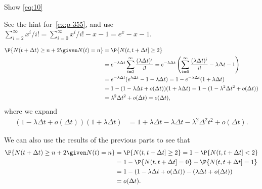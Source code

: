 \begin{exercise} \label{ex:p-35}
 Show \cref{eq:10}
\begin{hint}
See the hint for~\cref{ex:p-355}, and  use $\sum_{i=2}^\infty x^i/i! = \sum_{i=0}^\infty x^i/i! - x -1 = e^x -x - 1$.
\end{hint}
\begin{solution}
 \begin{align*}
 \P{N(t+\Delta t) \geq n+2 \given N(t) = n}
&= \P{N(t, t+\Delta t] \geq 2} \\
&= e^{-\lambda \Delta t} \sum_{i=2}^\infty \frac{(\lambda \Delta t)^i}{i!}
= e^{-\lambda \Delta t} \left(\sum_{i=0}^\infty \frac{(\lambda \Delta t)^i}{i!} - \lambda \Delta t - 1\right)\\
&= e^{-\lambda \Delta t}(e^{\lambda \Delta t} - 1 - \lambda \Delta t)
= 1 - e^{-\lambda \Delta t}(1 + \lambda \Delta t) \\
&= 1 - (1-\lambda \Delta t + o(\Delta t))(1+\lambda \Delta t)
= 1 - (1-\lambda^2 \Delta t^2 + o(\Delta t)) \\
&= \lambda^2 \Delta t^2 + o(\Delta t) = o(\Delta t),
 \end{align*}
where we expand
\begin{align*}
(1-\lambda \Delta t + o(\Delta t))(1+\lambda \Delta t)
&= 1 + \lambda \Delta t - \lambda \Delta t - \lambda^{2} \Delta^{2} t^{2} + o(\Delta t).
\end{align*}


We can also use the results of the previous parts to see that
\begin{align*}
 \P{N(t+\Delta t) \geq n+2 \given N(t) = n}
&= \P{N(t, t+\Delta t] \geq 2} = 1- \P{N(t, t+\Delta t]<2} \\
&= 1 - \P{N(t, t+\Delta t]= 0} - \P{N(t, t+\Delta t]=1} \\
&= 1 - (1-\lambda \Delta t + o(\Delta t) ) - (\lambda \Delta t + o(\Delta t)) \\
&= o(\Delta t).
\end{align*}
\end{solution}
\end{exercise}


